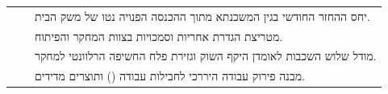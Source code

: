 \documentclass[12pt,a4paper,oneside]{book}
\begin{document}
\begin{table}[htbp]
\begin{tabularx}{\textwidth}{R{2.4cm} R{4.6cm} Y}
 &  & יחס ההחזר החודשי בגין המשכנתא מתוך ההכנסה הפנויה נטו של משק הבית. \\
 &  & מטריצת הגדרת אחריות וסמכויות בצוות המחקר והפיתוח. \\
 &  & מודל שלוש השכבות לאומדן היקף השוק וגזירת פלח החשיפה הרלוונטי למחקר. \\
 &  & מבנה פירוק עבודה היררכי לחבילות עבודה () ותוצרים מדידים. \\
\bottomrule
\end{tabularx}
\end{table}

\mainmatter









\backmatter
\cleardoublepage
\printbibliography
\end{document}
